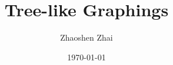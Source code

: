 \documentclass{amsart}
\begin{document}
    \title{Tree-like Graphings}
    \author{Zhaoshen Zhai}
    \date{\today}
    \maketitle
\end{document}

